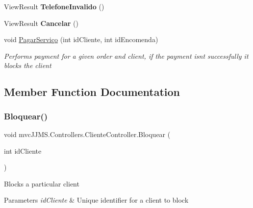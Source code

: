 \begin{DoxyCompactItemize}
View\+Result {\bfseries Telefone\+Invalido} ()
\item 
\mbox{\label{classmvc_j_j_m_s_1_1_controllers_1_1_cliente_controller_a0043cef3a9faa31c164bfba141b5d22b}} 
View\+Result {\bfseries Cancelar} ()
\item 
void \mbox{\hyperlink{classmvc_j_j_m_s_1_1_controllers_1_1_cliente_controller_ac3bcc6f76f48dfc5553f1686e2f44dd5}{Pagar\+Serviço}} (int id\+Cliente, int id\+Encomenda)
\begin{DoxyCompactList}\small\item\em Performs payment for a given order and client, if the payment isn\textquotesingle{}t successfully it blocks the client \end{DoxyCompactList}\end{DoxyCompactItemize}


\subsection{Member Function Documentation}
\mbox{\label{classmvc_j_j_m_s_1_1_controllers_1_1_cliente_controller_a75678bb2dcb7f48853343d9bf898d64a}} 
\subsubsection{\texorpdfstring{Bloquear()}{Bloquear()}}
{\footnotesize\ttfamily void mvc\+J\+J\+M\+S.\+Controllers.\+Cliente\+Controller.\+Bloquear (\begin{DoxyParamCaption}\item[{int}]{id\+Cliente }\end{DoxyParamCaption})\hspace{0.3cm}{\ttfamily [inline]}}



Blocks a particular client 


\begin{DoxyParams}{Parameters}
{\em id\+Cliente} & Unique identifier for a client to block\\
\hline
\end{DoxyParams}
\mbox{\label{classmvc_j_j_m_s_1_1_controllers_1_1_cliente_controller_ab916e41bf8757268e95796c1cf86d3df}} 
